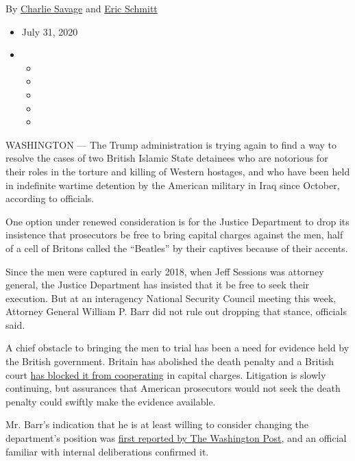 By \href{https://www.nytimes.com/by/charlie-savage}{Charlie Savage} and
\href{https://www.nytimes.com/by/eric-schmitt}{Eric Schmitt}

\begin{itemize}
\item
  July 31, 2020
\item
  \begin{itemize}
  \item
  \item
  \item
  \item
  \item
  \end{itemize}
\end{itemize}

WASHINGTON --- The Trump administration is trying again to find a way to
resolve the cases of two British Islamic State detainees who are
notorious for their roles in the torture and killing of Western
hostages, and who have been held in indefinite wartime detention by the
American military in Iraq since October, according to officials.

One option under renewed consideration is for the Justice Department to
drop its insistence that prosecutors be free to bring capital charges
against the men, half of a cell of Britons called the ``Beatles'' by
their captives because of their accents.

Since the men were captured in early 2018, when Jeff Sessions was
attorney general, the Justice Department has insisted that it be free to
seek their execution. But at an interagency National Security Council
meeting this week, Attorney General William P. Barr did not rule out
dropping that stance, officials said.

A chief obstacle to bringing the men to trial has been a need for
evidence held by the British government. Britain has abolished the death
penalty and a British court
\href{https://www.nytimes.com/2020/03/25/us/isis-beatles-death-penalty.html}{has
blocked it from cooperating} in capital charges. Litigation is slowly
continuing, but assurances that American prosecutors would not seek the
death penalty could swiftly make the evidence available.

Mr. Barr's indication that he is at least willing to consider changing
the department's position was
\href{https://www.washingtonpost.com/national-security/ag-barr-willing-to-consider-forgoing-death-penalty-to-secure-prosecution-of-isis-detainees-allegedly-involved-in-beheadings-of-american-hostages/2020/07/31/71e475f0-cdd4-11ea-91f1-28aca4d833a0_story.html?hpid=hp_hp-more-top-stories_hostages-205pm\%3Ahomepage\%2Fstory-ans}{first
reported by The Washington Post}, and an official familiar with internal
deliberations confirmed it.

